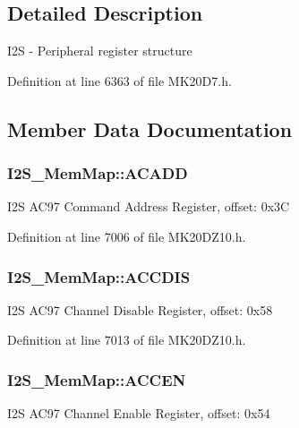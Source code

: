\subsection{Detailed Description}
I2S -\/ Peripheral register structure 

Definition at line 6363 of file M\+K20\+D7.\+h.



\subsection{Member Data Documentation}
\subsubsection[{\texorpdfstring{A\+C\+A\+DD}{ACADD}}]{ I2\+S\+\_\+\+Mem\+Map\+::\+A\+C\+A\+DD}\hypertarget{struct_i2_s___mem_map_a63227335f1eb56fcaeda017807d0da32}{}\label{struct_i2_s___mem_map_a63227335f1eb56fcaeda017807d0da32}
I2S A\+C97 Command Address Register, offset\+: 0x3C 

Definition at line 7006 of file M\+K20\+D\+Z10.\+h.

\subsubsection[{\texorpdfstring{A\+C\+C\+D\+IS}{ACCDIS}}]{ I2\+S\+\_\+\+Mem\+Map\+::\+A\+C\+C\+D\+IS}\hypertarget{struct_i2_s___mem_map_abed27b74f9f5869a313dc62c530a8da4}{}\label{struct_i2_s___mem_map_abed27b74f9f5869a313dc62c530a8da4}
I2S A\+C97 Channel Disable Register, offset\+: 0x58 

Definition at line 7013 of file M\+K20\+D\+Z10.\+h.

\subsubsection[{\texorpdfstring{A\+C\+C\+EN}{ACCEN}}]{ I2\+S\+\_\+\+Mem\+Map\+::\+A\+C\+C\+EN}\hypertarget{struct_i2_s___mem_map_a156c1bbbdb2fed8a7c7e9cf510f93873}{}\label{struct_i2_s___mem_map_a156c1bbbdb2fed8a7c7e9cf510f93873}
I2S A\+C97 Channel Enable Register, offset\+: 0x54 

